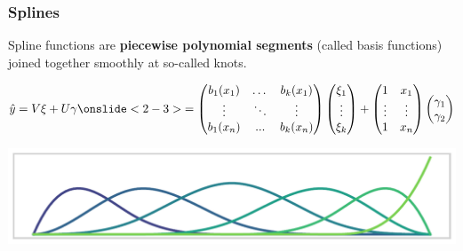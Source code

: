 \documentclass[final]{beamer}
\begin{document}
\begin{frame}[b]
\frametitle{Splines}

Spline functions are \textbf{piecewise polynomial segments} (called basis functions) joined together smoothly at so-called knots.
\begin{overprint}
\begin{align*}
\hat{y} = V\xi + U\gamma 
\onslide<2-3>{
= \begin{pmatrix}
b_1(x_1) & \dots & b_k(x_1) \\
 \vdots  & \ddots & \vdots \\
b_1(x_n) & ... & b_k(x_n)
\end{pmatrix} 
\begin{pmatrix}
\xi_1 \\
 \vdots   \\
\xi_k 
\end{pmatrix} 
+ 
\begin{pmatrix}
1 &  x_1 \\
 \vdots & \vdots \\
1 & x_n
\end{pmatrix} 
\begin{pmatrix}
\gamma_1 \\
\gamma_2 
\end{pmatrix} 
}
\end{align*}


\end{overprint}




\begin{center}
\includegraphics[width=\textwidth]{Images/bases}
\end{center}

\end{frame}
\end{document}
